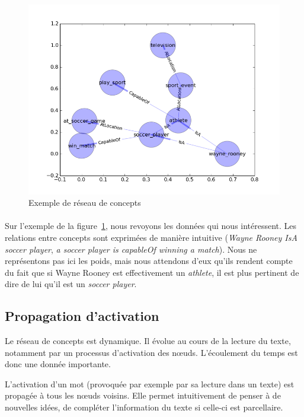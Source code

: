 \documentclass[a4paper, 12pt]{article}
\begin{document}
\begin{figure}[h]
 \centering
 \includegraphics[width=14cm]{./rc_exemple.png}
 \caption{\label{fig:rc_exemple}Exemple de réseau de concepts}
\end{figure}

\paragraph{}
Sur l'exemple de la figure~\ref{fig:rc_exemple}, nous revoyons les données qui nous intéressent. Les relations entre concepts sont exprimées de manière intuitive (\textit{Wayne Rooney IsA soccer player}, \textit{a soccer player is capableOf winning a match}). Nous ne représentons pas ici les poids, mais nous attendons d'eux qu'ils rendent compte du fait que si Wayne Rooney est effectivement un \textit{athlete}, il est plus pertinent de dire de lui qu'il est un \textit{soccer player}.


\subsection{Propagation d'activation}

Le réseau de concepts est dynamique. Il évolue au cours de la lecture du texte, notamment par un processus d'activation des n\oe{}uds. L'écoulement du temps est donc une donnée importante.

L'activation d'un mot (provoquée par exemple par sa lecture dans un texte) est propagée à tous les n\oe{}uds voisins. Elle permet intuitivement de penser à de nouvelles idées, de compléter l'information du texte si celle-ci est parcellaire.
\end{document}
